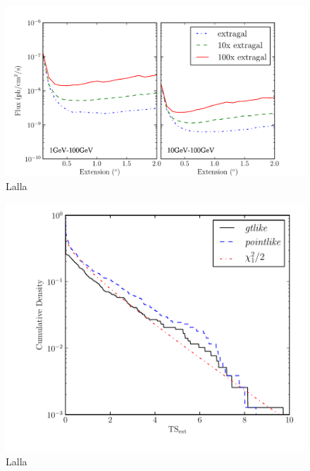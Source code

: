 \documentclass[preprint]{aastex}
\begin{document}
\clearpage

\begin{figure}
  \begin{center}
    \includegraphics{mc_plots/diff_factor_sensitivity.pdf}
    \end{center}
    \caption{Lalla}\label{diff_factor_sensitivity}
  \end{figure}

\begin{figure}
  \begin{center}
    \includegraphics{source_plots/agn.pdf}
    \end{center}
    \caption{Lalla}\label{agn_ts_ext}
  \end{figure}
\end{document}
